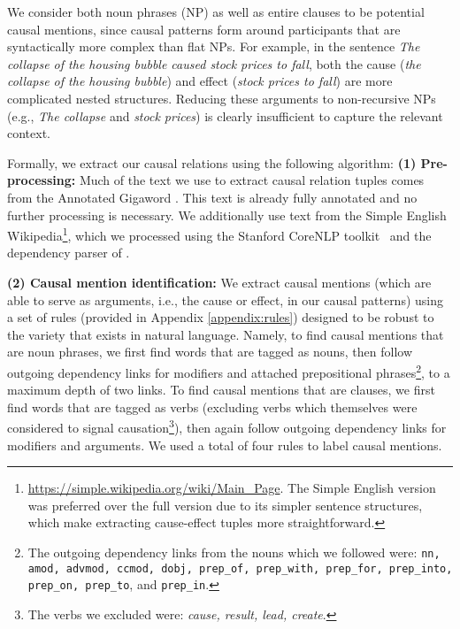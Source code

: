 We consider both noun phrases (NP) as well as entire %
clauses to be potential causal mentions, since causal patterns form around participants that are syntactically more complex than flat NPs.  
For example, in the sentence \emph{The collapse of the housing bubble caused stock prices to fall}, both the cause ({\em the collapse of the housing bubble}) and effect ({\em stock prices to fall}) are more complicated nested structures.  Reducing these arguments to non-recursive NPs (e.g., {\em The collapse} and {\em stock prices}) is clearly insufficient to capture the relevant context.

Formally, we extract our causal relations using the following algorithm:
{\flushleft \textbf{(1) Pre-processing:}} Much of the text we use to extract causal relation tuples comes from the Annotated Gigaword \citep{napoles2012annotated}.  This text is already fully annotated and no further processing is necessary.  We additionally use text from the Simple English Wikipedia\footnote{{\scriptsize \url{https://simple.wikipedia.org/wiki/Main_Page}}.  The Simple English version was preferred over the full version due to its simpler sentence structures, which make extracting cause-effect tuples more straightforward.}, which we processed using the Stanford CoreNLP toolkit~\citep{Manning:14} and the dependency parser of \citet{chen14}.

{\flushleft \textbf{(2) Causal mention identification:}} \label{step:cm} We extract causal mentions (which are able to serve as arguments, i.e., the cause or effect,  in our causal patterns) using a set of rules (provided in Appendix \ref{appendix:rules}) 
designed to be robust to the variety that exists in natural language. %
Namely, to find causal mentions that are noun phrases, we first find words that are tagged as nouns, then follow outgoing dependency links for modifiers and attached prepositional phrases\footnote{The outgoing dependency links from the nouns which we followed were: \texttt{nn, amod, advmod, ccmod, dobj, prep\_of, prep\_with, prep\_for, prep\_into, prep\_on, prep\_to}, and \texttt{prep\_in}.}, to a maximum depth of two links.  To find causal mentions that are clauses, we first find words that are tagged as verbs (excluding verbs which themselves were considered to signal causation\footnote{The verbs we excluded were: \emph{cause, result, lead, create}.}), then again follow outgoing dependency links for modifiers and arguments.  We used a total of four rules to label causal mentions.%

